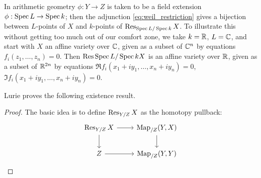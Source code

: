 \begin{eg}
In arithmetic geometry $\phi: Y \to Z$ is taken to be a field extension $\phi : \operatorname{Spec} L \to \operatorname{Spec} k$; then the adjunction
\ref{eq:weil_restriction} gives a bijection between $L$-points of $X$ and $k$-points of $\operatorname{Res}_{\operatorname{Spec} L/\operatorname{Spec} k}X$. To illustrate
this without getting too much out of our comfort zone, we take $k = \mathbb R$, $L = \mathbb C$, and start with $X$ an affine variety over $\mathbb C$,
given as a subset of $\mathbb C^n$ by equations $f_i(z_1, \dots, z_n) = 0$. Then $\operatorname{Res}{\operatorname{Spec} L/\operatorname{Spec} k}X$ is an affine variety over $\mathbb R$,
given as a subset of $\mathbb R^{2n}$ by equations $\Re f_i(x_1 + i y_1, \dots, x_n + i y_n) = 0$, 
$\Im f_i(x_1 + i y_1, \dots, x_n + i y_n) = 0$.
\end{eg}

Lurie proves the following existence result.

\begin{thm}

\end{thm}
\begin{proof}
The basic idea is to define $\operatorname{Res}_{Y/Z}X$ as the homotopy pullback:
\[
\begin{tikzcd}
\Res_{Y/Z}X\arrow{r}\arrow{d} & \Map_{/Z}(Y,X)\arrow{d} \\
Z\arrow{r} & \Map_{/Z}(Y,Y)
\end{tikzcd}
\]
\end{proof}


